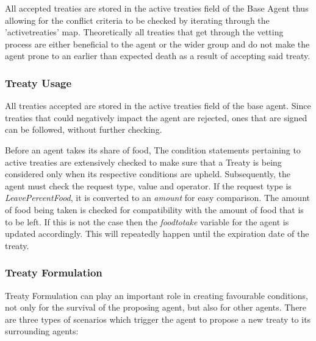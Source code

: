 All accepted treaties are stored in the active treaties field of the Base Agent thus allowing for the conflict criteria to be checked by iterating through the 'activetreaties' map. Theoretically all treaties that get through the vetting process are either beneficial to the agent or the wider group and do not make the agent prone to an earlier than expected death as a result of accepting said treaty.


\subsubsection{Treaty Usage}
\label{subsec: Treaty Usage}
All treaties accepted are stored in the active treaties field of the base agent. Since treaties that could negatively impact the agent are rejected, ones that are signed can be followed, without further checking. 

Before an agent takes its share of food, The condition statements pertaining to active treaties are extensively checked to make sure that a Treaty is being considered only when its respective conditions are upheld. Subsequently, the agent must check the request type, value and operator. If the request type is \textit{LeavePercentFood}, it is converted to an \textit{amount} for easy comparison. 
The amount of food being taken is checked for compatibility with the amount of food that is to be left. If this is not the case then the \textit{foodtotake} variable for the agent is updated accordingly.
This will repeatedly happen until the expiration date of the treaty.

\subsubsection{Treaty Formulation}
\label{subsec: Treaty Formulation}
Treaty Formulation can play an important role in creating favourable conditions, not only for the survival of the proposing agent, but also for other agents. There are three types of scenarios which trigger the agent to propose a new treaty to its surrounding agents:

